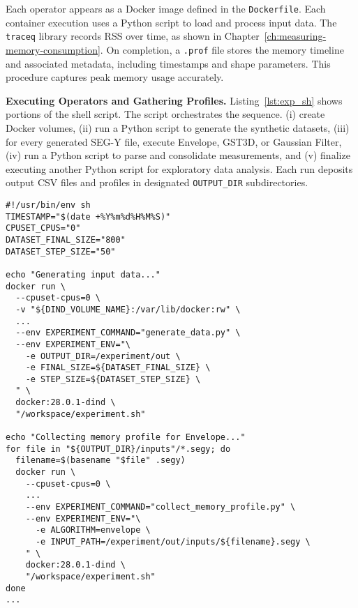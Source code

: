 Each operator appears as a Docker image defined in the \texttt{Dockerfile}.
Each container execution uses a Python script to load and process input data.
The \texttt{traceq} library records \ac{RSS} over time, as shown in Chapter~\ref{ch:measuring-memory-consumption}.
On completion, a \texttt{.prof} file stores the memory timeline and associated metadata, including timestamps and shape parameters.
This procedure captures peak memory usage accurately.

\vspace{1em}
\noindent
\textbf{Executing Operators and Gathering Profiles.}
Listing~\ref{lst:exp_sh} shows portions of the shell script.
The script orchestrates the sequence.
(i) create Docker volumes,
(ii) run a Python script to generate the synthetic datasets,
(iii) for every generated \ac{SEG-Y} file, execute Envelope, \ac{GST3D}, or Gaussian Filter,
(iv) run a Python script to parse and consolidate measurements,
and (v) finalize executing another Python script for exploratory data analysis.
Each run deposits output \ac{CSV} files and profiles in designated \texttt{OUTPUT\_DIR} subdirectories.

\vspace{1em}
\begin{lstlisting}[style=bashstyle,caption={Excerpts from \texttt{experiment.sh}~\cite{delucca2025experiment2script} that orchestrate Docker-based runs. Variables like \texttt{DATASET\_FINAL\_SIZE} and \texttt{DATASET\_STEP\_SIZE} define shape ranges for dataset generation.}, label={lst:exp_sh}]
#!/usr/bin/env sh
TIMESTAMP="$(date +%Y%m%d%H%M%S)"
CPUSET_CPUS="0"
DATASET_FINAL_SIZE="800"
DATASET_STEP_SIZE="50"

echo "Generating input data..."
docker run \
  --cpuset-cpus=0 \
  -v "${DIND_VOLUME_NAME}:/var/lib/docker:rw" \
  ...
  --env EXPERIMENT_COMMAND="generate_data.py" \
  --env EXPERIMENT_ENV="\
    -e OUTPUT_DIR=/experiment/out \
    -e FINAL_SIZE=${DATASET_FINAL_SIZE} \
    -e STEP_SIZE=${DATASET_STEP_SIZE} \
  " \
  docker:28.0.1-dind \
  "/workspace/experiment.sh"

echo "Collecting memory profile for Envelope..."
for file in "${OUTPUT_DIR}/inputs"/*.segy; do
  filename=$(basename "$file" .segy)
  docker run \
    --cpuset-cpus=0 \
    ...
    --env EXPERIMENT_COMMAND="collect_memory_profile.py" \
    --env EXPERIMENT_ENV="\
      -e ALGORITHM=envelope \
      -e INPUT_PATH=/experiment/out/inputs/${filename}.segy \
    " \
    docker:28.0.1-dind \
    "/workspace/experiment.sh"
done
...
\end{lstlisting}

